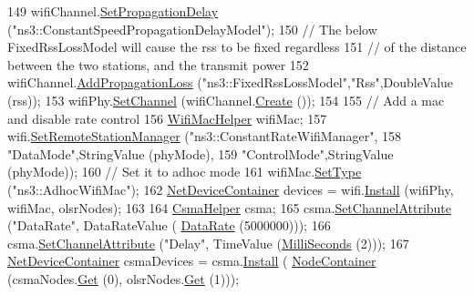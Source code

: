 \begin{DoxyCode}
149   wifiChannel.\hyperlink{classns3_1_1YansWifiChannelHelper_a6b452ba53ccaee6ca000cc72ed9ea0fa}{SetPropagationDelay} (\textcolor{stringliteral}{"ns3::ConstantSpeedPropagationDelayModel"});
150   \textcolor{comment}{// The below FixedRssLossModel will cause the rss to be fixed regardless}
151   \textcolor{comment}{// of the distance between the two stations, and the transmit power}
152   wifiChannel.\hyperlink{classns3_1_1YansWifiChannelHelper_a71c64d54e148b43698c65736e1c77156}{AddPropagationLoss} (\textcolor{stringliteral}{"ns3::FixedRssLossModel"},\textcolor{stringliteral}{"Rss"},DoubleValue (rss));
153   wifiPhy.\hyperlink{classns3_1_1YansWifiPhyHelper_ad2e9a27587dd4ff320435c93cc2676de}{SetChannel} (wifiChannel.\hyperlink{classns3_1_1YansWifiChannelHelper_a0532e292ab9452f3cf630c848708e563}{Create} ());
154 
155   \textcolor{comment}{// Add a mac and disable rate control}
156   \hyperlink{classns3_1_1WifiMacHelper}{WifiMacHelper} wifiMac;
157   wifi.\hyperlink{classns3_1_1WifiHelper_a3d01b178aeb2de246ab5a3aa5638ce24}{SetRemoteStationManager} (\textcolor{stringliteral}{"ns3::ConstantRateWifiManager"},
158                                 \textcolor{stringliteral}{"DataMode"},StringValue (phyMode),
159                                 \textcolor{stringliteral}{"ControlMode"},StringValue (phyMode));
160   \textcolor{comment}{// Set it to adhoc mode}
161   wifiMac.\hyperlink{classns3_1_1WifiMacHelper_a382d8df76a1dd7007179d1963b4b6bc6}{SetType} (\textcolor{stringliteral}{"ns3::AdhocWifiMac"});
162   \hyperlink{classns3_1_1NetDeviceContainer}{NetDeviceContainer} devices = wifi.\hyperlink{classns3_1_1WifiHelper_a451b3d33fa1497c22f06c5451f57a127}{Install} (wifiPhy, wifiMac, olsrNodes);
163 
164   \hyperlink{classns3_1_1CsmaHelper}{CsmaHelper} csma;
165   csma.\hyperlink{classns3_1_1CsmaHelper_a886d900b2fe44433e0b81752dea7e7f1}{SetChannelAttribute} (\textcolor{stringliteral}{"DataRate"}, DataRateValue (
      \hyperlink{classns3_1_1DataRate}{DataRate} (5000000)));
166   csma.\hyperlink{classns3_1_1CsmaHelper_a886d900b2fe44433e0b81752dea7e7f1}{SetChannelAttribute} (\textcolor{stringliteral}{"Delay"}, TimeValue (\hyperlink{group__timecivil_gaf26127cf4571146b83a92ee18679c7a9}{MilliSeconds} (2)));
167   \hyperlink{classns3_1_1NetDeviceContainer}{NetDeviceContainer} csmaDevices = csma.\hyperlink{classns3_1_1CsmaHelper_af79a91372595230b0817200270ab84e7}{Install} (
      \hyperlink{classns3_1_1NodeContainer}{NodeContainer} (csmaNodes.\hyperlink{classns3_1_1NodeContainer_a9ed96e2ecc22e0f5a3d4842eb9bf90bf}{Get} (0), olsrNodes.\hyperlink{classns3_1_1NodeContainer_a9ed96e2ecc22e0f5a3d4842eb9bf90bf}{Get} (1)));

\end{DoxyCode}
